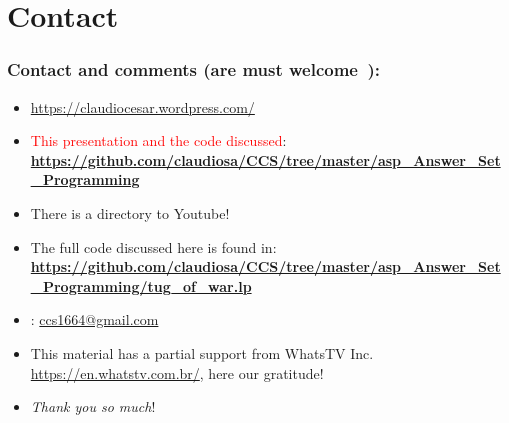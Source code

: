 \documentclass{beamer}
\begin{document}
\section*{Contact}

\begin{frame}
\frametitle{Contact and comments (are must welcome\ \Smiley):}
  
\begin{block}{}
  \begin{itemize}
  \item \url{https://claudiocesar.wordpress.com/}
   \item \textcolor{red}{This presentation and the code discussed}:\\
   \textbf{\textcolor{blue}{\url{https://github.com/claudiosa/CCS/tree/master/asp_Answer_Set_Programming}}}
   \item There is a directory to Youtube!
   \item  The full code discussed here is found in:\\ \textbf{\textcolor{blue}{\url{https://github.com/claudiosa/CCS/tree/master/asp_Answer_Set_Programming/tug_of_war.lp}}}
    
  \item \Letter: \url{ccs1664@gmail.com}
  \item This material has a partial support from WhatsTV Inc. \url{https://en.whatstv.com.br/}, here our gratitude!
  \item \textit{Thank you so much}!

  \end{itemize}
  \end{block}

\end{frame}


\end{document}
